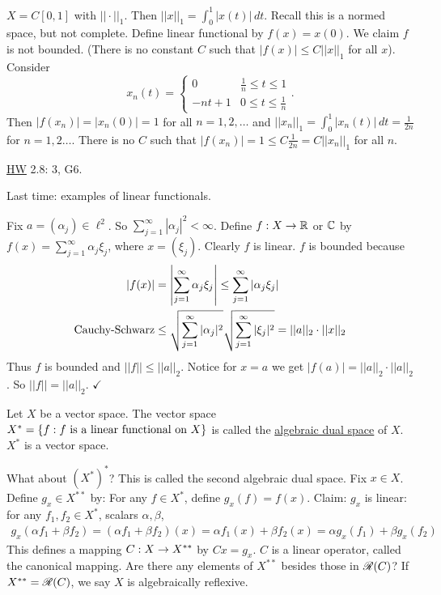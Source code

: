 \documentclass[]{article}
\begin{document}
\begin{example}
	$X = C[0,1]$ with $||\cdot||_1$.
	Then $||x||_1 = \int_0^1|x(t)|\,dt$. Recall this is a normed space, but not complete.
	Define linear functional by $f(x) = x(0)$. We claim $f$ is not bounded.
	(There is no constant $C$ such that $|f(x)|\leq C||x||_1$ for all $x$).
	Consider $$x_n(t) = \begin{cases} 0 & \frac1n\leq t\leq 1 \\ -nt+1 & 0\leq t\leq\frac1n \end{cases}.$$
	Then $|f(x_n)| = |x_n(0)| = 1$ for all $n=1,2,\dots$ and $||x_n||_1 = \int_0^1|x_n(t)|\,dt = \frac1{2n}$ for $n=1,2\dots$.
	There is no $C$ such that $|f(x_n)|=1\leq C\frac1{2n} = C||x_n||_1$ for all $n$.
\end{example}
\ul{HW} 2.8: 3, G6.

\newpage
Last time: examples of linear functionals.

\begin{example}
	[$X=\ell^2$] Fix $a = (\alpha_j)\in\ell^2$.
	So $\sum_{j=1}^\infty |\alpha_j|^2<\infty$. Define $f:X\rightarrow\mathbb{R}$ or $\mathbb{C}$ by $f(x) = \sum_{j=1}^\infty \alpha_j\xi_j$, where $x=(\xi_j)$.
	Clearly $f$ is linear.
	$f$ is bounded because 
	\begin{align*}
		|f(x)| &= \left|\sum_{j=1}^\infty \alpha_j\xi_j\right|
			   \leq \sum_{j=1}^\infty |\alpha_j\xi_j| \\
		\text{Cauchy-Schwarz}	   &\leq \sqrt{\sum_{j=1}^\infty |\alpha_j|^2}\sqrt{\sum_{j=1}^\infty |\xi_j|^2} 
			   = ||a||_2\cdot ||x||_2
	\end{align*}
	Thus $f$ is bounded and $||f||\leq||a||_2$.
	Notice for $x=a$ we get $|f(a)| = ||a||_2\cdot ||a||_2$.
	So $||f||=||a||_2$. $\checkmark$
\end{example}

\begin{definition}
	Let $X$ be a vector space. The vector space $X^* = \left\{ f : f\text{ is a linear functional on }X \right\}$ is called the \ul{algebraic dual space} of $X$.
	$X^*$ is a vector space. 
\end{definition}
	What about $(X^*)^*$? This is called the second algebraic dual space.
Fix $x\in X$. Define $g_x\in X^{**}$ by:
For any $f\in X^*$, define $g_x(f) = f(x)$.
Claim: $g_x$ is linear: for any $f_1,f_2\in X^*$, scalars $\alpha,\beta$,
\begin{align*}
	g_x(\alpha f_1+\beta f_2) = (\alpha f_1+\beta f_2)(x) 
							  = \alpha f_1(x) + \beta f_2(x) 
							  = \alpha g_x(f_1) + \beta g_x(f_2)
\end{align*}
This defines a mapping $C:X\rightarrow X^{**}$ by $Cx = g_x$.
$C$ is a linear operator, called the canonical mapping.
Are there any elements of $X^{**}$ besides those in $\mathscr{R}(C)$?
If $X^{**} = \mathscr{R}(C)$, we say $X$ is algebraically reflexive.
\end{document}
